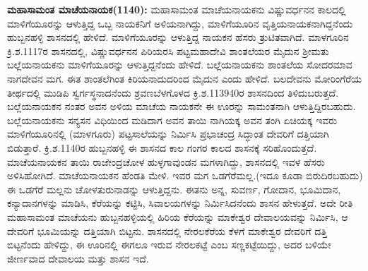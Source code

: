 \textbf{ಮಹಾಸಾಮಂತ ಮಾಚೆಯನಾಯಕ(1140):} ಮಹಾಸಾಮಂತ ಮಾಚೆಯನಾಯಕನು ವಿಷ್ಣುವರ್ಧನನ ಕಾಲದಲ್ಲಿ ಮಾಳಿಗೆಯೂರನ್ನು ಆಳುತ್ತಿದ್ದ ಒಬ್ಬ ನಾಯಕನಿಗೆ ಅಳಿಯನಾಗಿದ್ದು, ಮಾಳಿಗೆಯೂರಿನ ವೃತ್ತಿಯನಾಯಕನಾಗಿದ್ದನೆಂದು ಹುಬ್ಬನಹಳ್ಳಿ ಶಾಸನದಲ್ಲಿ ಹೇಳಿದೆ. ಮಾಳಿಗೆಯೂರನ್ನು ಆಳುತ್ತಿದ್ದ ನಾಯಕನ ಹೆಸರು ತ್ರುಟಿತವಾಗಿದೆ. ಮಾಳಗೂರಿನ ಕ್ರಿ.ಶ.1117ರ ಶಾಸನದಲ್ಲಿ, ವಿಷ್ಣುವರ್ಧನನ ಪಿರಿಯರಸಿ ಪಟ್ಟಮಹಾದೇವಿ ಶಾಂತಲೆಯರ ಮೈದುನ ಶ‍್ರೀಮತು ಬಲ್ಲೆಯ\-ನಾಯಕನು ಮಾಳಿಗೆಯೂರನ್ನು ಆಳುತ್ತಿದ್ದನೆಂದು ಹೇಳಿದೆ. ಬಲ್ಲೆಯನಾಯಕನು ಶಾಂತಲೆಯ ಸೋದರಮಾವ ನಾಗದೇವನ ಮಗ. ಈತ ಶಾಂತಲೆಗಿಂತ ಕಿರಿಯನಾದುದರಿಂದ ಮೈದುನ ಎಂದು ಹೇಳಿದೆ. ಬಲದೇವನು ಮೋರಿಂಗೆರೆಯ ತೀರ್ಥದಲ್ಲಿ ಮುಡಿಪಿ ಸ್ವರ್ಗಸ್ಥನಾದನೆಂದು ಶ್ರವಣಬೆಳಗೊಳದ ಕ್ರಿ.ಶ.1139\enginline{-}40ರ ಶಾಸನದಿಂದ ತಿಳಿದುಬರುತ್ತದೆ. ಬಲ್ಲೆಯನಾಯಕನ ನಂತರ ಅವನ ಅಳಿಯ ಮಾಚೆಯ ನಾಯಕನೇ ಈ ಊರನ್ನು ಸಾಮಂತನಾಗಿ ಆಳುತ್ತಿದ್ದಿರಬಹುದು. ಬಲ್ಲೆಯನಾಯಕನು ಸನ್ಯಸನ ವಿಧಿಯಿಂದ ಮಡಿದಾಗ ಅವನ ತಾಯಿ ನಾಗಿಯಕ್ಕ ಅವನ ತಂಗಿ ಏಚಿಯಕ್ಕ ಇವರು ಮಾಳಿಗೆಯೂರಿನಲ್ಲಿ (ಮಾಳಗೂರು) ಪಟ್ಟಸಾಲೆಯನ್ನು ನಿರ್ಮಿಸಿ ಪ್ರಭಾಚಂದ್ರ ಸಿದ್ಧಾಂತ ದೇವರಿಗೆ ದತ್ತಿಯಾಗಿ ಬಿಡುತ್ತಾರೆ. ಕ್ರಿ.ಶ.1140ರ ಹುಬ್ಬನಹಳ್ಳಿ ಈ ಶಾಸನದ ಕಾಲ ಗಂಗರ ಕಾಲದ ಶಾಸನಕ್ಕೆ ಸರಿಹೊಂದುತ್ತದೆ. ಮಾಚೆಯನಾಯಕನ ತಾಯಿ ರಾಜೇಂದ್ರಚೋಳ ಹುಳ್ಳಗಾವುಂಡನ ಮಗಳಾಗಿದ್ದು, ಶಾಸನದಲ್ಲಿ ಇವಳ ಹೆಸರು ಅಳಿಸಿಹೋಗಿದೆ. ಮಾಚೆಯನಾಯಕನ ಹೆಂಡತಿ ಮೇಳಿ. ಇವರ ಮಗ ಒಡಗೆರೆಮಲ್ಲ.(ಇದೂ ಕೂಡಾ ಬಿರುದಿರಬಹುದು) ಈ ಒಡಗೆರೆ ಮಲ್ಲನು ಚೋಳತುರುನಾಡನ್ನು ಆಳುತ್ತಿದ್ದನು. ಈತನು ಅನ್ನ, ಸುವರ್ಣ, ಗೋದಾನ, ಭೂಮಿದಾನ, ಕನ್ಯಾದಾನಗಳನ್ನು ಮಾಡಿಸಿ, ಕೆರೆಯನ್ನು ಕಟ್ಟಿಸಿ, ಸಿವಾಲಯಗಳನ್ನು ನಿರ್ಮಿಸಿದನೆಂದು ಶಾಸನ ಹೇಳುತ್ತದೆ. ಅದೇ ರೀತಿ ಮಹಾಸಾಮಂತ ಮಾಚೆಯನು ಹುಬ್ಬನಹಳ್ಳಿಯಲ್ಲಿ ಹಿರಿಯ ಕೆರೆಯನ್ನು ಮಾಕೇಶ್ವರ ದೇವಾಲಯವನ್ನು ನಿರ್ಮಿಸಿ, ಆ ದೇವರಿಗೆ ಭೂಮಿಯನ್ನು ದತ್ತಿಯಾಗಿ ಬಿಟ್ಟನು. ಶಾಸನದಲ್ಲಿ ನೇರಲಕೆರೆಯ ಕೆಳಗೆ ಮಾಕೇಶ್ವರ ದೇವರಿಗೆ ದತ್ತಿ ಬಿಟ್ಟನೆಂದು ಹೇಳಿದ್ದು, ಈ ಊರಿನಲ್ಲಿ ಈಗಲೂ ಇರುವ ನೇರಲಕಟ್ಟೆ ಎಂಬ ಸಣ್ಣಕಟ್ಟೆಯಿದ್ದು, ಅದರ ಬಳಿಯೇ ಜೀರ್ಣವಾದ ದೇವಾಲಯ ಮತ್ತು ಶಾಸನ ಇದೆ.

